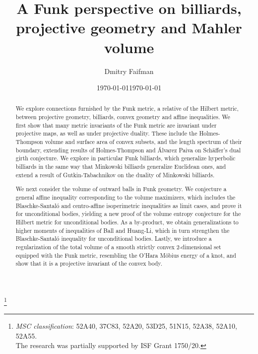 \documentclass[reqno,10pt]{amsart}
\title{A Funk perspective on billiards, projective geometry and Mahler volume}
\author{Dmitry Faifman}
\date{\today}
\newcounter{mp}
\begin{document}
	


	\date{\today}
	
	
	
	\begin{abstract}
		We explore connections furnished by the Funk metric, a relative of the Hilbert metric, between projective geometry, billiards, convex geometry and affine inequalities. We first show that many metric invariants of the Funk metric are invariant under projective maps, as well as under projective duality. These include the Holmes-Thompson volume and surface area of convex subsets, and the length spectrum of their boundary, extending results of Holmes-Thompson and \'Alvarez Paiva on Sch\"affer's dual girth conjecture. We explore in particular Funk billiards, which generalize hyperbolic billiards in the same way that Minkowski billiards generalize Euclidean ones, and extend a result of Gutkin-Tabachnikov on the duality of Minkowski billiards.
		
		We next consider the volume of outward balls in Funk geometry. We conjecture a general affine inequality corresponding to the volume maximizers, which includes the Blaschke-Santal\'o and centro-affine isoperimetric inequalities as limit cases, and prove it for unconditional bodies, yielding a new proof of the volume entropy conjecture for the Hilbert metric for unconditional bodies.  As a by-product, we obtain generalizations to higher moments of inequalities of Ball and Huang-Li, which in turn strengthen the Blaschke-Santal\'o inequality for unconditional bodies. Lastly, we introduce a regularization of the total volume of a smooth strictly convex 2-dimensional set equipped with the Funk metric, resembling the O'Hara M\"obius energy of a knot, and show that it is a projective invariant of the convex body. 
%		
	\end{abstract}
	
	\thanks{{\it MSC classification}:
	52A40, %
	37C83,  %
	52A20, %
	53D25, 	%
	51N15,  %
	52A38, %
    52A10, %
	52A55.  	%
	\\\indent The research was partially supported by ISF Grant 1750/20.
}
	
\end{document}
